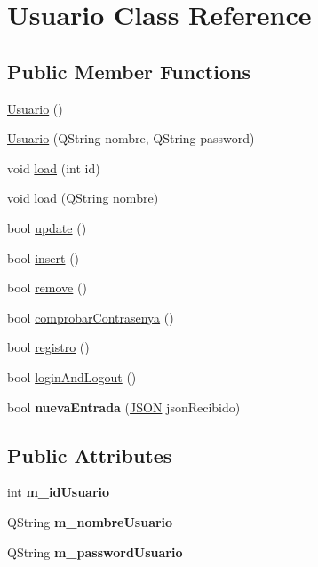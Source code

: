 \hypertarget{classUsuario}{}\section{Usuario Class Reference}
\label{classUsuario}
\subsection*{Public Member Functions}
\begin{DoxyCompactItemize}
\item 
\mbox{\hyperlink{classUsuario_aa85a5371a098dfba5449140d9b8a472f}{Usuario}} ()
\item 
\mbox{\hyperlink{classUsuario_a21975acad49ffd19aa3cf818d03527ad}{Usuario}} (Q\+String nombre, Q\+String password)
\item 
void \mbox{\hyperlink{classUsuario_a582cfc5fb035575f66240d1784c50632}{load}} (int id)
\item 
void \mbox{\hyperlink{classUsuario_ab1cdc9970f8f50f4b554a563fd2ab41d}{load}} (Q\+String nombre)
\item 
bool \mbox{\hyperlink{classUsuario_abccc47bddb1deac69920f4dcb7a44b97}{update}} ()
\item 
bool \mbox{\hyperlink{classUsuario_a6adb77ca92414402116ed0256718b227}{insert}} ()
\item 
bool \mbox{\hyperlink{classUsuario_a2e01f0e772aabe9c66ef326eca458405}{remove}} ()
\item 
bool \mbox{\hyperlink{classUsuario_a708f7cbd127ba0f9a91a1b5c681fa5e7}{comprobar\+Contrasenya}} ()
\item 
bool \mbox{\hyperlink{classUsuario_aea05bcbf762bc5c6d1e33990f2c52bf4}{registro}} ()
\item 
bool \mbox{\hyperlink{classUsuario_a03850510ec70df9a5da7f31e66034d8a}{login\+And\+Logout}} ()
\item 
\mbox{\label{classUsuario_a8776b368054f04bf01dd238efe19166d}} 
bool {\bfseries nueva\+Entrada} (\mbox{\hyperlink{classnlohmann_1_1basic__json}{J\+S\+ON}} json\+Recibido)
\end{DoxyCompactItemize}
\subsection*{Public Attributes}
\begin{DoxyCompactItemize}
\item 
\mbox{\label{classUsuario_adceaf46ad17f76c19ec6f2a98baba133}} 
int {\bfseries m\+\_\+id\+Usuario}
\item 
\mbox{\label{classUsuario_a69a690d2e969ab1b32ae18f94e0fb0e3}} 
Q\+String {\bfseries m\+\_\+nombre\+Usuario}
\item 
\mbox{\label{classUsuario_a6771c927d80c3c8495ed08c16dfc8488}} 
Q\+String {\bfseries m\+\_\+password\+Usuario}
\end{DoxyCompactItemize}


